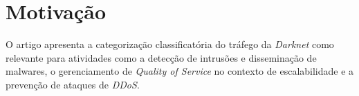 \section{Motivação}

O artigo apresenta a categorização classificatória do tráfego da \emph{Darknet}
como relevante para atividades como a detecção de intrusões e disseminação de
malwares, o gerenciamento de \emph{Quality of Service} no contexto de escalabilidade e a 
prevenção de ataques de \emph{DDoS}.